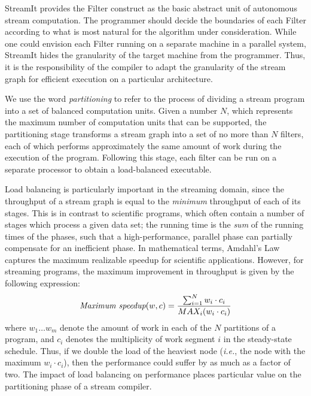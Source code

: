 StreamIt provides the Filter construct as the basic abstract unit of
autonomous stream computation.  The programmer should decide the
boundaries of each Filter according to what is most natural for the
algorithm under consideration.  While one could envision each Filter
running on a separate machine in a parallel system, StreamIt hides the
granularity of the target machine from the programmer.  Thus, it is
the responsibility of the compiler to adapt the granularity of the
stream graph for efficient execution on a particular architecture.

We use the word {\it partitioning} to refer to the process of dividing
a stream program into a set of balanced computation units.  Given a
number $N$, which represents the maximum number of computation units
that can be supported, the partitioning stage transforms a stream
graph into a set of no more than $N$ filters, each of which performs
approximately the same amount of work during the execution of the
program.  Following this stage, each filter can be run on a separate
processor to obtain a load-balanced executable.

Load balancing is particularly important in the streaming domain,
since the throughput of a stream graph is equal to the {\it minimum}
throughput of each of its stages.  This is in contrast to scientific
programs, which often contain a number of stages which process a given
data set; the running time is the {\it sum} of the running times of
the phases, such that a high-performance, parallel phase can partially
compensate for an inefficient phase.  In mathematical terms, Amdahl's
Law captures the maximum realizable speedup for scientific
applications.  However, for streaming programs, the maximum
improvement in throughput is given by the following expression:
\begin{align*}
\mbox{\it Maximum speedup}(w, c) = \frac{\sum_{i=1}^N{w_i \cdot c_i}}{MAX_i(w_i \cdot c_i)}
\end{align*}
where $w_1 \dots w_m$ denote the amount of work in each of the $N$
partitions of a program, and $c_i$ denotes the multiplicity of work
segment $i$ in the steady-state schedule.  Thus, if we double the load
of the heaviest node ({\it i.e.}, the node with the maximum $w_i \cdot
c_i$), then the performance could suffer by as much as a factor of
two.  The impact of load balancing on performance places particular
value on the partitioning phase of a stream compiler.

